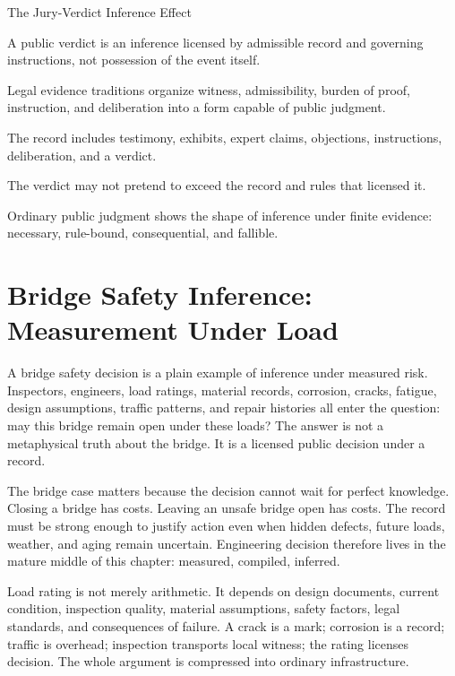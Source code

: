 \begin{phenom}{The Jury-Verdict Inference Effect~\cite{wigmore1904}}
\label{ph:jury-verdict-inference}

\PhStatement
A public verdict is an inference licensed by admissible record and governing
instructions, not possession of the event itself.

\PhOrigin
Legal evidence traditions organize witness, admissibility, burden of proof,
instruction, and deliberation into a form capable of public judgment.

\PhObservation
The record includes testimony, exhibits, expert claims, objections,
instructions, deliberation, and a verdict.

\PhConstraint
The verdict may not pretend to exceed the record and rules that licensed it.

\PhConsequence
Ordinary public judgment shows the shape of inference under finite evidence:
necessary, rule-bound, consequential, and fallible.
\end{phenom}

\section{Bridge Safety Inference: Measurement Under Load}

A bridge safety decision is a plain example of inference under measured risk.
Inspectors, engineers, load ratings, material records, corrosion, cracks,
fatigue, design assumptions, traffic patterns, and repair histories all enter
the question: may this bridge remain open under these loads? The answer is
not a metaphysical truth about the bridge. It is a licensed public decision
under a record.

The bridge case matters because the decision cannot wait for perfect
knowledge. Closing a bridge has costs. Leaving an unsafe bridge open has
costs. The record must be strong enough to justify action even when hidden
defects, future loads, weather, and aging remain uncertain. Engineering
decision therefore lives in the mature middle of this chapter: measured,
compiled, inferred.

Load rating is not merely arithmetic. It depends on design documents, current
condition, inspection quality, material assumptions, safety factors, legal
standards, and consequences of failure. A crack is a mark; corrosion is a
record; traffic is overhead; inspection transports local witness; the rating
licenses decision. The whole argument is compressed into ordinary
infrastructure.

